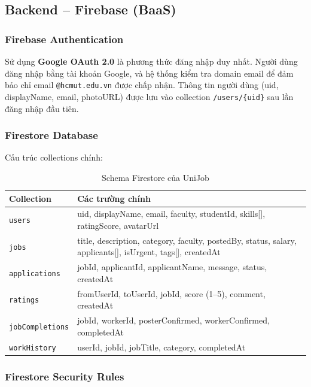 \subsection{Backend -- Firebase (BaaS)}

\subsubsection{Firebase Authentication}

Sử dụng \textbf{Google OAuth 2.0} là phương thức đăng nhập duy nhất. Người dùng đăng nhập
bằng tài khoản Google, và hệ thống kiểm tra domain email để đảm bảo chỉ email
\texttt{@hcmut.edu.vn} được chấp nhận. Thông tin người dùng (uid, displayName, email,
photoURL) được lưu vào collection \texttt{/users/\{uid\}} sau lần đăng nhập đầu tiên.

\subsubsection{Firestore Database}

Cấu trúc collections chính:

\begin{table}[H]
\centering
\caption{Schema Firestore của UniJob}
\renewcommand{\arraystretch}{1.2}
\begin{tabularx}{\textwidth}{|p{3.2cm}|X|}
\hline
\textbf{Collection} & \textbf{Các trường chính} \\
\hline
\texttt{users}       & uid, displayName, email, faculty, studentId, skills[], ratingScore, avatarUrl \\
\hline
\texttt{jobs}        & title, description, category, faculty, postedBy, status, salary, applicants[], isUrgent, tags[], createdAt \\
\hline
\texttt{applications}& jobId, applicantId, applicantName, message, status, createdAt \\
\hline
\texttt{ratings}     & fromUserId, toUserId, jobId, score (1--5), comment, createdAt \\
\hline
\texttt{jobCompletions} & jobId, workerId, posterConfirmed, workerConfirmed, completedAt \\
\hline
\texttt{workHistory} & userId, jobId, jobTitle, category, completedAt \\
\hline
\end{tabularx}
\end{table}

\subsubsection{Firestore Security Rules}

